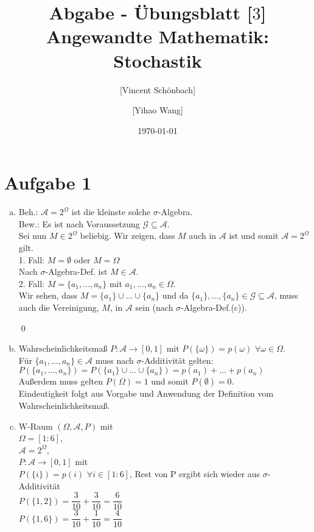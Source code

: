 \documentclass[10pt,a4paper]{article}
\begin{document}
\title{Abgabe - Übungsblatt [$3$]\\
\small{Angewandte Mathematik: Stochastik}}
\author{ [Vincent Schönbach] \and [Yihao Wang]}
\date{\today}
\maketitle

\section*{Aufgabe 1}
\begin{enumerate}[a)]
 \item Beh.: $\mathcal{A} = 2^\Omega$ ist die kleinste solche $\sigma$-Algebra.\\[1ex]
 Bew.: Es ist nach Voraussetzung $\mathcal{G} \subseteq \mathcal{A}$. \\
 Sei nun $M \in 2^\Omega$ beliebig. Wir zeigen, dass $M$ auch in $\mathcal{A}$ ist und somit $\mathcal{A} = 2^\Omega$ gilt.\\
 1. Fall: $M = \emptyset$ oder $M = \Omega$ \\
   Nach $\sigma$-Algebra-Def. ist $M \in \mathcal{A}$. \\
 2. Fall: $M = \{a_1,...,a_n\}$ mit $a_1,...,a_n \in \Omega$. \\
 Wir sehen, dass $M= \{a_1\} \cup ... \cup \{a_n\}$ und da $\{a_1\}, ..., \{a_n\} \in \mathcal{G}\subseteq \mathcal{A}$,
 muss auch die Vereinigung, $M$, in $\mathcal{A}$ sein (nach $\sigma$-Algebra-Def.(c)).
 
  \qed
  
 \item
 Wahrscheinlichkeitsmaß $P : \mathcal{A} \rightarrow [0,1]$ mit $P(\{\omega\})=p(\omega)$ $\forall \omega\in\Omega.$ \\
 Für $\{a_1,...,a_n\}\in\mathcal{A}$ muss nach $\sigma$-Additivität gelten: \\
 $P(\{a_1,...,a_n\})=P(\{a_1\} \cup ... \cup \{a_n\}) = p(a_1) + ... + p(a_n)$\\
 Außerdem muss gelten $P(\Omega) = 1$ und somit $P(\emptyset) = 0$.\\
 Eindeutigkeit folgt aus Vorgabe und Anwendung der Definition vom Wahrscheinlichkeitsmaß.
 
 \item W-Raum $(\Omega, \mathcal{A}, P)$ mit \\
 $\Omega = [1:6]$,\\
 $\mathcal{A} = 2^\Omega$,\\
 $P:\mathcal{A}\rightarrow [0,1]$ mit \\
 $P(\{i\})=p(i)$ $\forall i\in[1:6]$, Rest von P ergibt sich wieder aus $\sigma$-Additivität\\
 $P(\{1,2\}) = \dfrac{3}{10} + \dfrac{3}{10} = \dfrac{6}{10}$ \\
 $P(\{1,6\}) = \dfrac{3}{10} + \dfrac{1}{10} = \dfrac{4}{10}$ \\
 
\end{enumerate}
\end{document}
